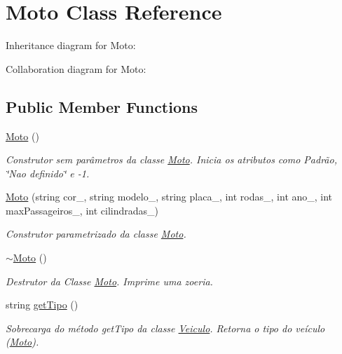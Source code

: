\hypertarget{classMoto}{}\section{Moto Class Reference}
\label{classMoto}


Inheritance diagram for Moto\+:


Collaboration diagram for Moto\+:
\subsection*{Public Member Functions}
\begin{DoxyCompactItemize}
\item 
\mbox{\label{classMoto_a2eacbcb3cbcf7015f4229e4f69b04f56}} 
\hyperlink{classMoto_a2eacbcb3cbcf7015f4229e4f69b04f56}{Moto} ()
\begin{DoxyCompactList}\small\item\em Construtor sem parâmetros da classe \hyperlink{classMoto}{Moto}. Inicia os atributos como Padrão, \char`\"{}\+Nao definido\char`\"{} e -\/1. \end{DoxyCompactList}\item 
\hyperlink{classMoto_a33aaebd3c96762dc92794c69994a27db}{Moto} (string cor\+\_\+, string modelo\+\_\+, string placa\+\_\+, int rodas\+\_\+, int ano\+\_\+, int max\+Passageiros\+\_\+, int cilindradas\+\_\+)
\begin{DoxyCompactList}\small\item\em Construtor parametrizado da classe \hyperlink{classMoto}{Moto}. \end{DoxyCompactList}\item 
\mbox{\label{classMoto_a1f4624ebdd55bdc4a7ec32f70ab9f4ca}} 
\hyperlink{classMoto_a1f4624ebdd55bdc4a7ec32f70ab9f4ca}{$\sim$\+Moto} ()
\begin{DoxyCompactList}\small\item\em Destrutor da Classe \hyperlink{classMoto}{Moto}. Imprime uma zoeria. \end{DoxyCompactList}\item 
string \hyperlink{classMoto_a5d51c4a754d495c84ec9b7abf5a243e0}{get\+Tipo} ()
\begin{DoxyCompactList}\small\item\em Sobrecarga do método get\+Tipo da classe \hyperlink{classVeiculo}{Veiculo}. Retorna o tipo do veículo (\hyperlink{classMoto}{Moto}). \end{DoxyCompactList}\item 

\end{DoxyCompactItemize}
